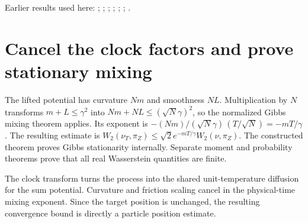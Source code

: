 \documentclass[11pt,a4paper]{article}
\begin{document}
Earlier results used here: \cite[Section~3.1.1]{LangevinLean2026IPLA}; \cite[Section~3.1.4]{LangevinLean2026IPLA}; \cite[Section~3.17.1]{LangevinLean2026Kinetic}; \cite[Section~3.19.1]{LangevinLean2026Kinetic}; \cite[Section~3.33.1]{LangevinLean2026Kinetic}; \cite[Section~3.53.1]{LangevinLean2026Kinetic}; \cite[Section~3.58.2]{LangevinLean2026Kinetic}.

\section{\texorpdfstring{Cancel the clock factors and prove stationary mixing}{Cancel the clock factors and prove stationary mixing}}


The lifted potential has curvature \(Nm\) and smoothness \(NL\). Multiplication by \(N\) transforms \(m+L\le\gamma^2\) into \(Nm+NL\le(\sqrt N\gamma)^2\), so the normalized Gibbs mixing theorem applies. Its exponent is \(-(Nm)/(\sqrt N\gamma)\,(T/\sqrt N)=-mT/\gamma\). The resulting estimate is \(W_2(\nu_T,\pi_Z)\le\sqrt2e^{-mT/\gamma}W_2(\nu,\pi_Z)\). The constructed theorem proves Gibbs stationarity internally. Separate moment and probability theorems prove that all real Wasserstein quantities are finite.



The clock transform turns the process into the shared unit-temperature diffusion for the sum potential. Curvature and friction scaling cancel in the physical-time mixing exponent. Since the target position is unchanged, the resulting convergence bound is directly a particle position estimate.
\end{document}
